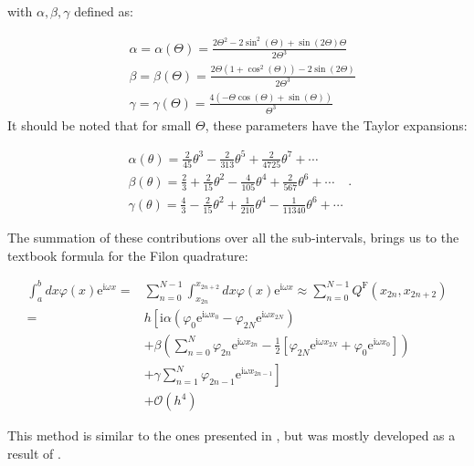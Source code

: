 with $\alpha, \beta, \gamma$ defined as:

\begin{equation}
    \begin{aligned}
        &\alpha=\alpha(\Theta)=\frac{2 \Theta^{2}-2 \sin ^{2}(\Theta)+\sin (2 \Theta) \Theta}{2 \Theta^{3}}\\
        &\beta=\beta(\Theta)=\frac{2 \Theta\left(1+\cos ^{2}(\Theta)\right)-2 \sin (2 \Theta)}{2 \Theta^{3}}\\
        &\gamma=\gamma(\Theta)=\frac{4(-\Theta \cos (\Theta)+\sin (\Theta))}{\Theta^{3}}
    \end{aligned} \label{abg}
\end{equation}
\vspace{0.25in}
It should be noted that for small $\Theta$, these parameters have the Taylor expansions:

\begin{equation}
    \begin{array}{l}
        \alpha(\theta)=\frac{2}{45} \theta^{3}-\frac{2}{313} \theta^{5}+\frac{2}{4725} \theta^{7}+\cdots \\
        \beta(\theta)=\frac{2}{3}+\frac{2}{15} \theta^{2}-\frac{4}{105} \theta^{4}+\frac{2}{567} \theta^{6}+\cdots \\
        \gamma(\theta)=\frac{4}{3}-\frac{2}{15} \theta^{2}+\frac{1}{210} \theta^{4}-\frac{1}{11340} \theta^{6}+\cdots
        \end{array}.
\end{equation}

\vspace{0.25in}

The summation of these contributions over all the sub-intervals, brings us to the textbook formula for the Filon quadrature:

\begin{equation}
    \begin{aligned}
        \int_{a}^{b} d x \varphi(x) \mathrm{e}^{\mathrm{i} \omega x}=& \sum_{n=0}^{N-1} \int_{x_{2 n}}^{x_{2 n+2}} d x \varphi(x) \mathrm{e}^{\mathrm{i} \omega x} \approx \sum_{n=0}^{N-1} Q^{\text {F}}\left(x_{2 n}, x_{2 n+2}\right) \\
        =& h\left[\mathrm{i} \alpha\left(\varphi_{0} \mathrm{e}^{\mathrm{i} \omega x_{0}}-\varphi_{2 N} \mathrm{e}^{\mathrm{i} \omega x_{2 N}}\right)\right.\\
        &+\beta\left(\sum_{n=0}^{N} \varphi_{2 n} \mathrm{e}^{\mathrm{i} \omega x_{2 n}}-\frac{1}{2}\left[\varphi_{2 N} \mathrm{e}^{\mathrm{i} \omega x_{2 N}}+\varphi_{0} \mathrm{e}^{\mathrm{i} \omega x_{0}}\right]\right) \\
        &\left.+\gamma \sum_{n=1}^{N} \varphi_{2 n-1} \mathrm{e}^{\mathrm{i} \omega x_{2 n-1}}\right] \\
        &+\mathcal{O}\left(h^{4}\right)
    \end{aligned} \label{FilonQ}
\end{equation}

\vspace{0.25in}

This method is similar to the ones presented in \cite{ise} \cite{book1} \cite{fcc}, but was mostly developed as a result of \cite{con}.
